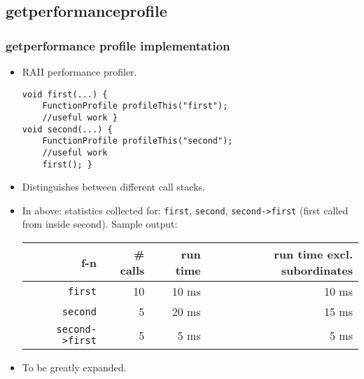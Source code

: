 \subsection{getperformanceprofile}
\begin{frame}[fragile]
\frametitle{getperformance profile implementation}
\begin{itemize}
\item RAII performance profiler.
\begin{verbatim}
void first(...) {
    FunctionProfile profileThis("first");
    //useful work }
void second(...) {
    FunctionProfile profileThis("second");
    //useful work
    first(); }
\end{verbatim}
\item Distinguishes between different call stacks. 
\item In above: statistics collected for: \verb|first|, \verb|second|, \verb|second->first| (first called from inside second). Sample output:
\begin{tabular}{|r|r|r|r|}\hline
f-n& \# calls & run time& run time excl. subordinates \\\hline
\verb|first| & 10& 10 ms & 10 ms\\\hline
\verb|second| & 5& 20 ms& 15 ms\\\hline
\verb|second->first|& 5& 5 ms & 5 ms\\\hline
\end{tabular}
\item To be greatly expanded.
\end{itemize}
\end{frame}

